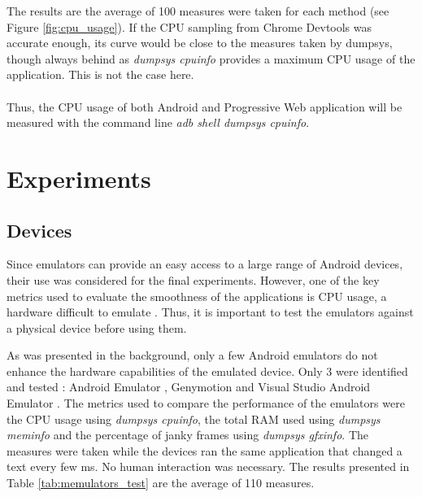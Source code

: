 \documentclass{kththesis}
\begin{document}
The results are the average of 100 measures were taken for each method (see Figure \ref{fig:cpu_usage}). If the CPU sampling from Chrome Devtools was accurate enough, its curve would be close to the measures taken by dumpsys, though always behind as \textit{dumpsys cpuinfo} provides a maximum CPU usage of the application. This is not the case here.

\paragraph{}
Thus, the CPU usage of both Android and Progressive Web application will be measured with the command line \textit{adb shell dumpsys cpuinfo}.
    
\section{Experiments}
    \subsection{Devices}

Since emulators can provide an easy access to a large range of Android devices, their use was considered for the final experiments. However, one of the key metrics used to evaluate the smoothness of the applications is CPU usage, a hardware difficult to emulate \cite{cpu_emulator}. Thus, it is important to test the emulators against a physical device before using them.

As was presented in the background, only a few Android emulators do not enhance the hardware capabilities of the emulated device. Only 3 were identified and tested : Android Emulator \cite{android_emulator}, Genymotion \cite{genymotion_emulator} and Visual Studio Android Emulator \cite{microsoft_emulator}. The metrics used to compare the performance of the emulators were the CPU usage using \textit{dumpsys cpuinfo}, the total RAM used using \textit{dumpsys meminfo} and the percentage of janky frames using \textit{dumpsys gfxinfo}. The measures were taken while the devices ran the same application that changed a text every few ms. No human interaction was necessary. \newline
The results presented in Table \ref{tab:memulators_test} are the average of 110 measures.
\end{document}
